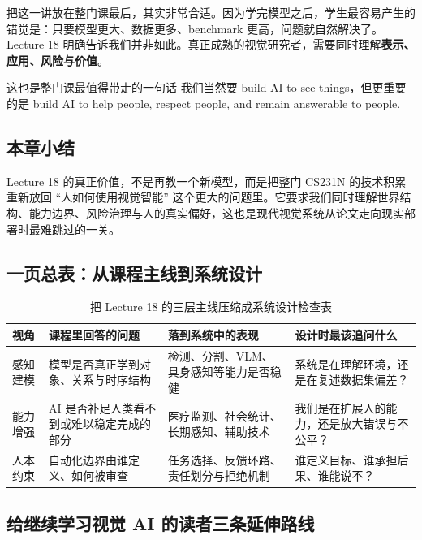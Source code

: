 把这一讲放在整门课最后，其实非常合适。因为学完模型之后，学生最容易产生的错觉是：只要模型更大、数据更多、benchmark 更高，问题就自然解决了。Lecture 18 明确告诉我们并非如此。真正成熟的视觉研究者，需要同时理解\textbf{表示、应用、风险与价值}。

\begin{warningbox}{这也是整门课最值得带走的一句话}
我们当然要 build AI to see things，但更重要的是 build AI to help people, respect people, and remain answerable to people.
\end{warningbox}

\subsection{本章小结}
Lecture 18 的真正价值，不是再教一个新模型，而是把整门 CS231N 的技术积累重新放回 ``人如何使用视觉智能'' 这个更大的问题里。它要求我们同时理解世界结构、能力边界、风险治理与人的真实偏好，这也是现代视觉系统从论文走向现实部署时最难跳过的一关。

\subsection{一页总表：从课程主线到系统设计}

\begin{table}[H]
\centering
\small
\renewcommand{\arraystretch}{1.18}
\begin{tabular}{p{2.8cm}p{3.4cm}p{3.6cm}p{4.0cm}}
\toprule
\textbf{视角} & \textbf{课程里回答的问题} & \textbf{落到系统中的表现} & \textbf{设计时最该追问什么} \\
\midrule
感知建模 & 模型是否真正学到对象、关系与时序结构 & 检测、分割、VLM、具身感知等能力是否稳健 & 系统是在理解环境，还是在复述数据集偏差？ \\
能力增强 & AI 是否补足人类看不到或难以稳定完成的部分 & 医疗监测、社会统计、长期感知、辅助技术 & 我们是在扩展人的能力，还是放大错误与不公平？ \\
人本约束 & 自动化边界由谁定义、如何被审查 & 任务选择、反馈环路、责任划分与拒绝机制 & 谁定义目标、谁承担后果、谁能说不？ \\
\bottomrule
\end{tabular}
\caption{把 Lecture 18 的三层主线压缩成系统设计检查表}
\end{table}

\subsection{给继续学习视觉 AI 的读者三条延伸路线}

